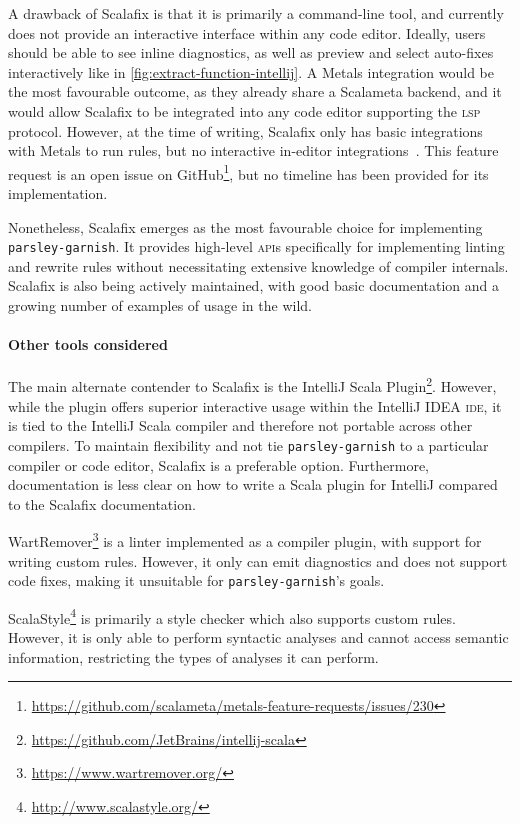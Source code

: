 \documentclass[../../main.tex]{subfiles}
\begin{document}
A drawback of Scalafix is that it is primarily a command-line tool, and currently does not provide an interactive interface within any code editor.
Ideally, users should be able to see inline diagnostics, as well as preview and select auto-fixes interactively like in \cref{fig:extract-function-intellij}.
A Metals integration would be the most favourable outcome, as they already share a Scalameta backend, and it would allow Scalafix to be integrated into any code editor supporting the \textsc{lsp} protocol.
However, at the time of writing, Scalafix only has basic integrations with Metals to run rules, but no interactive in-editor integrations~\cite{jaglin_scalafix_2024}.
This feature request is an open issue on GitHub\footnote{\url{https://github.com/scalameta/metals-feature-requests/issues/230}}, but no timeline has been provided for its implementation.

Nonetheless, Scalafix emerges as the most favourable choice for implementing \texttt{parsley-garnish}.
It provides high-level \textsc{api}s specifically for implementing linting and rewrite rules without necessitating extensive knowledge of compiler internals.
Scalafix is also being actively maintained, with good basic documentation and a growing number of examples of usage in the wild.

\paragraph{Other tools considered}
The main alternate contender to Scalafix is the IntelliJ Scala Plugin\footnote{\url{https://github.com/JetBrains/intellij-scala}}.
However, while the plugin offers superior interactive usage within the IntelliJ IDEA \textsc{ide}, it is tied to the IntelliJ Scala compiler and therefore not portable across other compilers.
To maintain flexibility and not tie \texttt{parsley-garnish} to a particular compiler or code editor, Scalafix is a preferable option.
Furthermore, documentation is less clear on how to write a Scala plugin for IntelliJ compared to the Scalafix documentation.

WartRemover\footnote{\url{https://www.wartremover.org/}} is a linter implemented as a compiler plugin, with support for writing custom rules.
However, it only can emit diagnostics and does not support code fixes, making it unsuitable for \texttt{parsley-garnish}'s goals.

ScalaStyle\footnote{\url{http://www.scalastyle.org/}} is primarily a style checker which also supports custom rules.
However, it is only able to perform syntactic analyses and cannot access semantic information, restricting the types of analyses it can perform.
\end{document}
